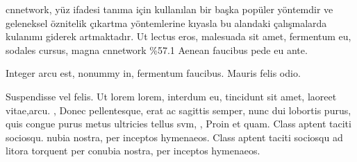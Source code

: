 \acrfull{cnnetwork}, yüz ifadesi tanıma için kullanılan bir başka popüler yöntemdir ve geleneksel öznitelik çıkartma yöntemlerine kıyasla bu alandaki çalışmalarda kulanımı giderek artmaktadır. 
\parencite{tumen2017}  Ut lectus eros, malesuada sit amet, fermentum eu, sodales cursus, magna \acrshort{cnnetwork}  \%57.1 Aenean faucibus pede eu ante.

\parencite{li2017}  Integer arcu est, nonummy in, fermentum faucibus.
\parencite{abanoz2018} Mauris felis odio.

\parencite{akayarıca2018} Suspendisse vel felis. Ut lorem lorem, interdum eu, tincidunt sit amet, laoreet vitae,arcu.
\parencite{liu2020}, Donec pellentesque, erat ac sagittis semper, nunc dui lobortis purus, quis
congue purus metus ultricies tellus \acrshort{svm}, \parencite{fengshao2020} , Proin et quam. Class aptent taciti sociosqu. 
\parencite{videlakumar2020} nubia nostra, per inceptos hymenaeos.
\parencite{mohan2021} Class aptent taciti sociosqu ad litora torquent per conubia nostra, per inceptos hymenaeos.







